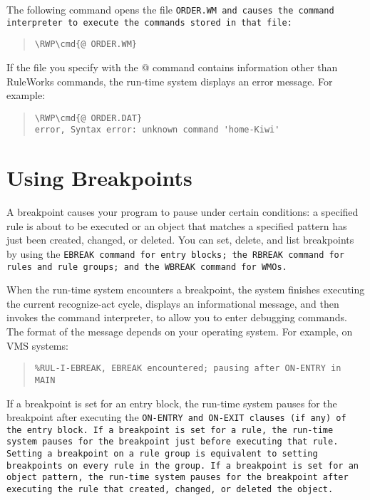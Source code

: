 The following command opens the file \tt{ORDER.WM} and causes the
command interpreter to execute the commands stored in that file:

\begin{quote}
\begin{Verbatim}[commandchars=\\\{\}]
\RWP\cmd{@ ORDER.WM}
\end{Verbatim}
\end{quote}

If the file you specify with the @ command contains information other
than RuleWorks commands, the run-time system displays an error
message. For example:

\begin{quote}
\begin{Verbatim}[commandchars=\\\{\}]
\RWP\cmd{@ ORDER.DAT}
error, Syntax error: unknown command 'home-Kiwi'
\end{Verbatim}
\end{quote}

\section{Using Breakpoints}

A breakpoint causes your program to pause under certain conditions: a
specified rule is about to be executed or an object that matches a
specified pattern has just been created, changed, or deleted. You can
set, delete, and list breakpoints by using the \tt{EBREAK} command for
entry blocks; the \tt{RBREAK} command for rules and rule groups; and
the \tt{WBREAK} command for WMOs.

When the run-time system encounters a breakpoint, the system finishes
executing the current recognize-act cycle, displays an informational
message, and then invokes the command interpreter, to allow you to
enter debugging commands. The format of the message depends on your
operating system. For example, on VMS systems:

\begin{quote}
\begin{verbatim}
%RUL-I-EBREAK, EBREAK encountered; pausing after ON-ENTRY in MAIN
\end{verbatim}
\end{quote}

If a breakpoint is set for an entry block, the run-time system pauses
for the breakpoint after executing the \tt{ON-ENTRY} and \tt{ON-EXIT}
clauses (if any) of the entry block. If a breakpoint is set for a
rule, the run-time system pauses for the breakpoint just before
executing that rule. Setting a breakpoint on a rule group is
equivalent to setting breakpoints on every rule in the group. If a
breakpoint is set for an object pattern, the run-time system pauses
for the breakpoint after executing the rule that created, changed, or
deleted the object.

